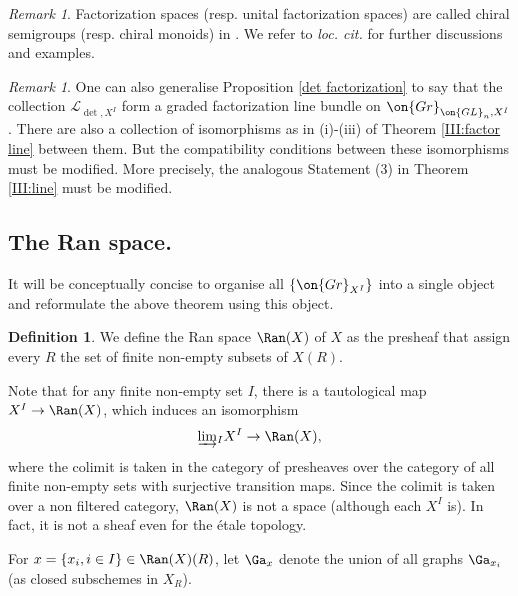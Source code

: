 \documentclass[]{pcmi}
\theoremstyle{plain}
\theoremstyle{remark}
\newtheorem{rmk}[equation]{Remark}
\theoremstyle{definition}
\newtheorem{dfn}[equation]{Definition}
\newcommand{\mL}{{\mathcal L}}
\newcommand{\Gr}{{\on{Gr}}}
\newcommand{\GL}{{\on{GL}}}
\begin{document}
\begin{rmk}
Factorization spaces (resp. unital factorization spaces) are called chiral semigroups (resp. chiral monoids) in \cite[\S\ 3.10.16]{BD0}. We refer to \emph{loc. cit.} for  further discussions and examples.
\end{rmk}

\begin{rmk}\label{det factorization2}
One can also generalise Proposition \ref{det factorization} to say that the collection $\mL_{\det, X^I}$ form a graded factorization line bundle on $\Gr_{\GL_n, X^I}$. There are also a collection of isomorphisms as in (i)-(iii) of Theorem \ref{III:factor line} between them. But the compatibility conditions between these isomorphisms must be modified. More precisely, the analogous Statement (3) in Theorem \ref{III:line} must be modified. 
\end{rmk}

\subsection{The Ran space.}
It will be conceptually concise to organise all $\{\Gr_{X^I}\}$ into a single object and reformulate the above theorem using this object. 

\begin{dfn}
We define the Ran space $\Ran(X)$ of $X$ as the presheaf that assign every $R$ the set of finite non-empty subsets of $X(R)$.
\end{dfn}

 
Note that for any finite non-empty set $I$, there is a tautological map $X^I\to \Ran(X)$, which induces an isomorphism
\[\underrightarrow{\lim}_I X^I\to \Ran(X),\]
where the colimit is taken in the category of presheaves over the category of all finite non-empty sets with surjective transition maps.  Since the colimit is taken over a non filtered category, $\Ran(X)$ is not a space (although each $X^I$ is). In fact, it is not a sheaf even for the \'etale topology.


For $x=\{x_i,i\in I\}\in \Ran(X)(R)$, let $\Ga_x$ denote the union of all graphs $\Ga_{x_i}$ (as closed subschemes in $X_R$).
\end{document}
